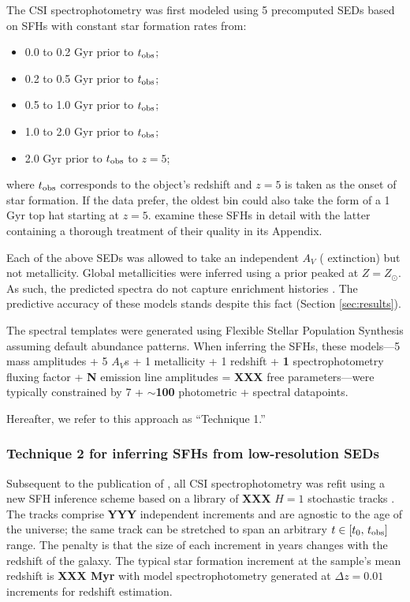\documentclass[a4paper,fleqn,usenatbib]{mnras}
\newcommand{\bfr}{\bf\color{red}}
\newcommand{\tobs}{t_{\rm obs}}
\newcommand{\bitem}{\begin{itemize}}
\newcommand{\eitem}{\end{itemize}}
\begin{document}
The CSI spectrophotometry was first modeled using 5 precomputed SEDs based on SFHs with 
constant star formation rates from:
\bitem
	\item 0.0 to 0.2 Gyr prior to $\tobs$;
	\item 0.2 to 0.5 Gyr prior to $\tobs$;
	\item 0.5 to 1.0 Gyr prior to $\tobs$;
	\item 1.0 to 2.0 Gyr prior to $\tobs$;
	\item 2.0 Gyr prior to $\tobs$ to $z=5$;
\eitem
where $\tobs$ corresponds to the object's redshift and $z=5$ is taken as the onset of star formation. If 
the data prefer, the oldest bin could also take the form of a 1 Gyr top hat starting at $z=5$. 
\citet{Dressler16, Dressler18} examine these SFHs in detail with the latter containing a thorough 
treatment of their quality in its Appendix.

Each of the above SEDs was allowed to take an independent $A_{V}$ (\citealt{Calzetti00} 
extinction) but not metallicity. Global metallicities were inferred using a prior peaked at 
$Z=Z_{\odot}$. As such, the predicted spectra do not capture enrichment histories 
\citep[cf.][]{Pacifici12, Morishita19}. The predictive accuracy of these models stands despite this fact (Section \ref{sec:results}).

The spectral templates were generated using Flexible Stellar Population Synthesis 
\citep[FSPS;][]{ConroyGunnWhite09} assuming default abundance patterns. When inferring the SFHs, 
these models---5 mass amplitudes + 5 $A_{V}$s + 1 metallicity + 1 redshift + {\bfr 1} spectrophotometry fluxing 
factor + {\bfr N} emission line amplitudes = {\bfr XXX} free parameters---were typically constrained by 
7 + {\bfr $\sim$100} photometric + spectral datapoints.

Hereafter, we refer to this approach as ``Technique 1.''

\subsubsection{Technique 2 for inferring SFHs from low-resolution SEDs}
\label{sec:h1}

Subsequent to the publication of \citet{Dressler18}, all CSI spectrophotometry was refit using a new 
SFH inference scheme based on a library of {\bfr XXX} $H=1$ stochastic tracks
\citep{Kelson14,Kelson16,Kelson19}. The tracks comprise {\bfr YYY} independent increments and are 
agnostic to the age of the universe; the same track can be stretched to span an arbitrary 
$t\in[t_{0},\,t_{\rm obs}]$ range. The penalty is that the size of each increment in years changes
with the redshift of the galaxy. The typical star formation increment at the sample's mean redshift 
is {\bfr XXX Myr} with model spectrophotometry generated at {\bfr $\Delta z = 0.01$} increments for
redshift estimation.
\end{document}
